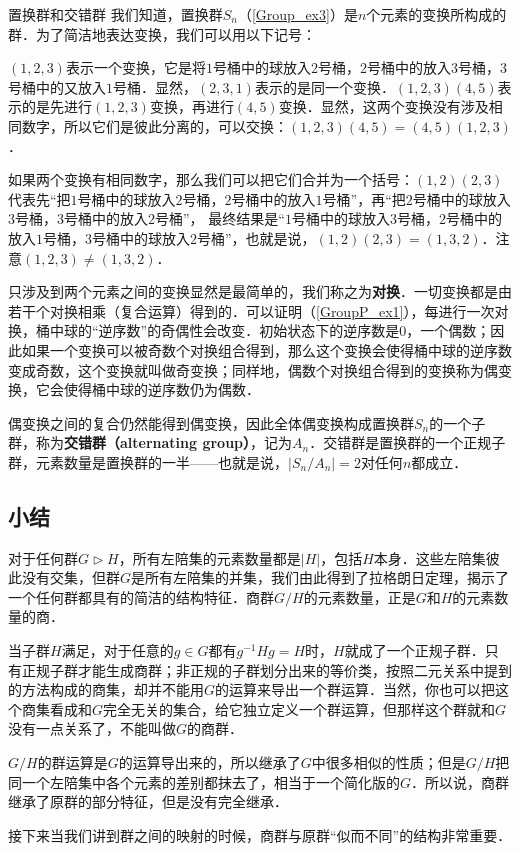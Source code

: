 \begin{example}{置换群和交错群}\label{NormSG_ex5}
我们知道，置换群$S_n$（\autoref{Group_ex3}）是$n$个元素的变换所构成的群．为了简洁地表达变换，我们可以用以下记号：

$(1,2,3)$表示一个变换，它是将$1$号桶中的球放入$2$号桶，$2$号桶中的放入$3$号桶，$3$号桶中的又放入$1$号桶．显然，$(2,3,1)$表示的是同一个变换．$(1,2,3)(4,5)$表示的是先进行$(1,2,3)$变换，再进行$(4,5)$变换．显然，这两个变换没有涉及相同数字，所以它们是彼此分离的，可以交换：$(1,2,3)(4,5)=(4,5)(1,2,3)$．

如果两个变换有相同数字，那么我们可以把它们合并为一个括号：$(1,2)(2,3)$代表先“把$1$号桶中的球放入$2$号桶，$2$号桶中的放入$1$号桶”，再“把$2$号桶中的球放入$3$号桶，$3$号桶中的放入$2$号桶”， 最终结果是“$1$号桶中的球放入$3$号桶，$2$号桶中的放入$1$号桶，$3$号桶中的球放入$2$号桶”，也就是说，$(1,2)(2,3)=(1,3,2)$．注意$(1,2,3)\not=(1,3,2)$．

只涉及到两个元素之间的变换显然是最简单的，我们称之为\textbf{对换}．一切变换都是由若干个对换相乘（复合运算）得到的．可以证明（\autoref{GroupP_ex1}），每进行一次对换，桶中球的“逆序数”的奇偶性会改变．初始状态下的逆序数是$0$，一个偶数；因此如果一个变换可以被奇数个对换组合得到，那么这个变换会使得桶中球的逆序数变成奇数，这个变换就叫做奇变换；同样地，偶数个对换组合得到的变换称为偶变换，它会使得桶中球的逆序数仍为偶数．

偶变换之间的复合仍然能得到偶变换，因此全体偶变换构成置换群$S_n$的一个子群，称为\textbf{交错群（alternating group）}，记为$A_n$．交错群是置换群的一个正规子群，元素数量是置换群的一半——也就是说，$|S_n/A_n|=2$对任何$n$都成立．
\end{example}

\subsection{小结}

对于任何群$G\triangleright H$，所有左陪集的元素数量都是$|H|$，包括$H$本身．这些左陪集彼此没有交集，但群$G$是所有左陪集的并集，我们由此得到了拉格朗日定理，揭示了一个任何群都具有的简洁的结构特征．商群$G/H$的元素数量，正是$G$和$H$的元素数量的商．

当子群$H$满足，对于任意的$g\in G$都有$g^{-1}Hg=H$时，$H$就成了一个正规子群．只有正规子群才能生成商群；非正规的子群划分出来的等价类，按照二元关系中提到的方法构成的商集，却并不能用$G$的运算来导出一个群运算．当然，你也可以把这个商集看成和$G$完全无关的集合，给它独立定义一个群运算，但那样这个群就和$G$没有一点关系了，不能叫做$G$的商群．

$G/H$的群运算是$G$的运算导出来的，所以继承了$G$中很多相似的性质；但是$G/H$把同一个左陪集中各个元素的差别都抹去了，相当于一个简化版的$G$．所以说，商群继承了原群的部分特征，但是没有完全继承．

接下来当我们讲到群之间的映射的时候，商群与原群“似而不同”的结构非常重要．
